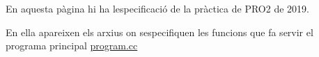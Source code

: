 En aquesta pàgina hi ha l\textquotesingle{}especificació de la pràctica de P\+R\+O2 de 2019.

En ella apareixen els arxius on s\textquotesingle{}especifiquen les funcions que fa servir el programa principal \hyperlink{program_8cc}{program.\+cc} 